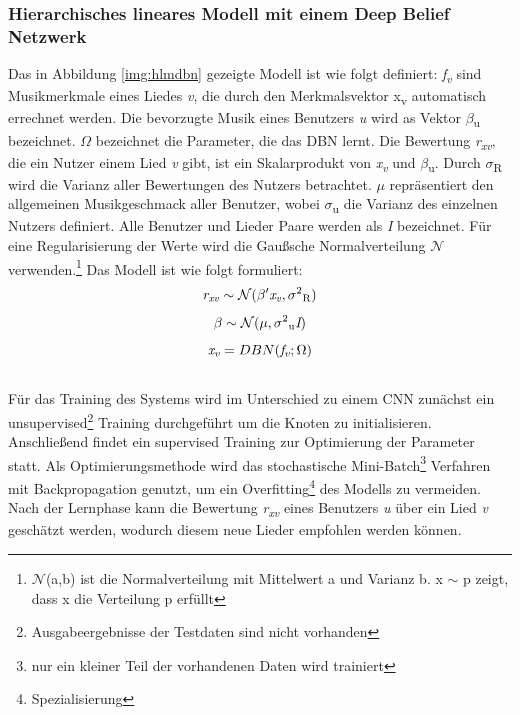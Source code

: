 \documentclass[twosided,a4,10pt]{article}
\begin{document}
\begin{multicols}{2}
		\subsubsection{Hierarchisches lineares Modell mit einem Deep Belief Netzwerk}
		Das in Abbildung \ref{img:hlmdbn} gezeigte Modell ist wie folgt definiert: \textit{f\textsubscript{v}} sind Musikmerkmale eines Liedes \textit{v}, die durch den Merkmalsvektor x\textsubscript{v} automatisch errechnet werden. Die bevorzugte Musik eines Benutzers \textit{u} wird as Vektor $\beta$\textsubscript{u} bezeichnet. $\Omega$ bezeichnet die Parameter, die das DBN lernt. Die Bewertung \textit{r\textsubscript{xv}}, die ein Nutzer einem Lied \textit{v} gibt, ist ein Skalarprodukt von \textit{x\textsubscript{v}} und $\beta$\textsubscript{u}. Durch $\sigma$\textsubscript{R} wird die Varianz aller Bewertungen des Nutzers betrachtet. $\mu$ repräsentiert den allgemeinen Musikgeschmack aller Benutzer, wobei $\sigma$\textsubscript{u} die Varianz des einzelnen Nutzers definiert. Alle Benutzer und Lieder Paare werden als \textit{I} bezeichnet. Für eine Regularisierung der Werte wird die Gaußsche Normalverteilung $\mathcal{N}$ verwenden.\footnote[16]{$\mathcal{N}$(a,b) ist die Normalverteilung mit Mittelwert a und Varianz b. x $\sim$ p zeigt, dass x die Verteilung p erfüllt}\newline
		Das Modell ist wie folgt formuliert:\newline
		\begin{equation*}
			\centering
			\textit{r\textsubscript{xv}}\sim\mathcal{N}(\beta'\textit{x\textsubscript{v}},\sigma\textsuperscript{2}\textsubscript{R})
		\end{equation*}
		\begin{equation*}
		\centering
			\beta\sim\mathcal{N}(\mu,\sigma\textsuperscript{2}\textsubscript{u}\textit{I})
		\end{equation*}
		\begin{equation*}
			\textit{x\textsubscript{v}} = DBN(\textit{f\textsubscript{v}};\Omega)
		\end{equation*}\newline\\
		Für das Training des Systems wird im Unterschied zu einem CNN zunächst ein unsupervised\footnote[17]{Ausgabeergebnisse der Testdaten sind nicht vorhanden} Training durchgeführt um die Knoten zu initialisieren. Anschließend findet ein supervised Training zur Optimierung der Parameter statt. Als Optimierungsmethode wird das stochastische Mini-Batch\footnote[18]{nur ein kleiner Teil der vorhandenen Daten wird trainiert} Verfahren mit Backpropagation genutzt, um ein Overfitting\footnote[19]{Spezialisierung} des Modells zu vermeiden. Nach der Lernphase kann die Bewertung \textit{r\textsubscript{xv}} eines Benutzers \textit{u} über ein Lied \textit{v} geschätzt werden, wodurch diesem neue Lieder empfohlen werden können. \cite{wang}

\end{multicols}
\end{document}
